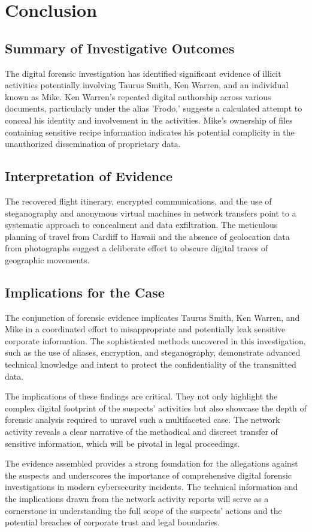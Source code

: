 \chapter{Conclusion}

\section{Summary of Investigative Outcomes}
The digital forensic investigation has identified significant evidence of illicit activities potentially involving Taurus Smith, Ken Warren, and an individual known as Mike. Ken Warren's repeated digital authorship across various documents, particularly under the alias 'Frodo,' suggests a calculated attempt to conceal his identity and involvement in the activities. Mike's ownership of files containing sensitive recipe information indicates his potential complicity in the unauthorized dissemination of proprietary data.

\section{Interpretation of Evidence}
The recovered flight itinerary, encrypted communications, and the use of steganography and anonymous virtual machines in network transfers point to a systematic approach to concealment and data exfiltration. The meticulous planning of travel from Cardiff to Hawaii and the absence of geolocation data from photographs suggest a deliberate effort to obscure digital traces of geographic movements.

\section{Implications for the Case}
The conjunction of forensic evidence implicates Taurus Smith, Ken Warren, and Mike in a coordinated effort to misappropriate and potentially leak sensitive corporate information. The sophisticated methods uncovered in this investigation, such as the use of aliases, encryption, and steganography, demonstrate advanced technical knowledge and intent to protect the confidentiality of the transmitted data.

The implications of these findings are critical. They not only highlight the complex digital footprint of the suspects' activities but also showcase the depth of forensic analysis required to unravel such a multifaceted case. The network activity reveals a clear narrative of the methodical and discreet transfer of sensitive information, which will be pivotal in legal proceedings.

The evidence assembled provides a strong foundation for the allegations against the suspects and underscores the importance of comprehensive digital forensic investigations in modern cybersecurity incidents. The technical information and the implications drawn from the network activity reports will serve as a cornerstone in understanding the full scope of the suspects' actions and the potential breaches of corporate trust and legal boundaries.
